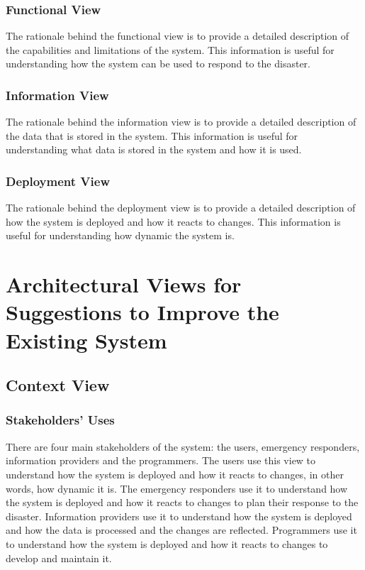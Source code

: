 \documentclass[a4paper]{article}
\begin{document}
    \subsubsection{Functional View}
    The rationale behind the functional view is to provide a detailed description of the capabilities and limitations of the
    system. This information is useful for understanding how the system can be used to respond to the disaster.
    \subsubsection{Information View}
    The rationale behind the information view is to provide a detailed description of the data that is stored in the system.
    This information is useful for understanding what data is stored in the system and how it is used.
    \subsubsection{Deployment View}
    The rationale behind the deployment view is to provide a detailed description of how the system is deployed and how it reacts
    to changes. This information is useful for understanding how dynamic the system is.

    \section{Architectural Views for Suggestions to Improve the Existing System}
    \subsection{Context View}
    \subsubsection{Stakeholders' Uses}
    There are four main stakeholders of the system: the users, emergency responders, information providers and the programmers.
    The users use this view to understand how the system is deployed and how it reacts to changes, in other words, how dynamic it is.
    The emergency responders use it to understand how the system is deployed and how it reacts to changes to plan their response
    to the disaster. Information providers use it to understand how the system is deployed and how the data is processed and the
    changes are reflected. Programmers use it to understand how the system is deployed and how it reacts to changes to develop
    and maintain it.
\end{document}

